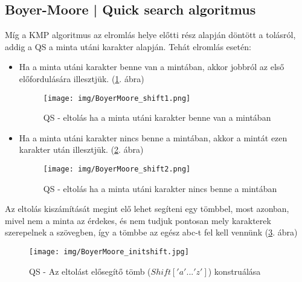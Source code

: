 \documentclass[margin=0px]{article}
\begin{document}
		\subsection{Boyer-Moore  | Quick search algoritmus}
			Míg a KMP algoritmus az elromlás helye előtti rész alapján döntött a tolásról, addig a QS a minta utáni karakter alapján. Tehát elromlás esetén:
			\begin{itemize}
				\item Ha a minta utáni karakter benne van a mintában, akkor jobbról az első előfordulására illesztjük. (\ref{fig:BoyerMoore_shift1}. ábra)
				\begin{figure}[H]
					\centering
					\texttt{[image: img/BoyerMoore\_shift1.png]}
					\caption{QS - eltolás ha a minta utáni karakter benne van a mintában}
					\label{fig:BoyerMoore_shift1}
				\end{figure}
				\item Ha a minta utáni karakter nincs benne a mintában, akkor a mintát ezen karakter után illesztjük. (\ref{fig:BoyerMoore_shift2}. ábra)
				\begin{figure}[H]
					\centering
					\texttt{[image: img/BoyerMoore\_shift2.png]}
					\caption{QS - eltolás ha a minta utáni karakter nincs benne a mintában}
					\label{fig:BoyerMoore_shift2}
				\end{figure}
			\end{itemize}
			
			Az eltolás kiszámítását megint elő lehet segíteni egy tömbbel, most azonban, mivel nem a minta az érdekes, és nem tudjuk pontosan mely karakterek szerepelnek a szövegben, így a tömbbe az egész abc-t fel kell vennünk (\ref{fig:BoyerMoore_initshift}. ábra)
			
			\begin{figure}[H]
				\centering
				\texttt{[image: img/BoyerMoore\_initshift.jpg]}
				\caption{QS - Az eltolást elősegítő tömb ($Shift['a'...'z']$) konstruálása}
				\label{fig:BoyerMoore_initshift}
			\end{figure}
			
\end{document}
